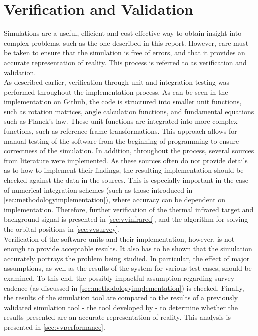 \chapter{Verification and Validation}
\label{ch:vandv}
Simulations are a useful, efficient and cost-effective way to obtain insight into complex problems, such as the one described in this report. However, care must be taken to ensure that the simulation is free of errors, and that it provides an accurate representation of reality. This process is referred to as verification and validation. \\

As described earlier, verification through unit and integration testing was performed throughout the implementation process. As can be seen in the implementation \href{https://github.com/ArjanVermeulen97/thesis-code.git}{on Github}, the code is structured into smaller unit functions, such as rotation matrices, angle calculation functions, and fundamental equations such as Planck's law. These unit functions are integrated into more complex functions, such as reference frame transformations. This approach allows for manual testing of the software from the beginning of programming to ensure correctness of the simulation. In addition, throughout the process, several sources from literature were implemented. As these sources often do not provide details as to how to implement their findings, the resulting implementation should be checked against the data in the sources. This is especially important in the case of numerical integration schemes (such as those introduced in \autoref{sec:methodologyimplementation}), where accuracy can be dependent on implementation. Therefore, further verification of the thermal infrared target and background signal is presented in \autoref{sec:vvinfrared}, and the algorithm for solving the orbital positions in \autoref{sec:vvsurvey}.\\

Verification of the software units and their implementation, however, is not enough to provide acceptable results. It also has to be shown that the simulation accurately portrays the problem being studied. In particular, the effect of major assumptions, as well as the results of the system for various test cases, should be examined. To this end, the possibly impactful assumption regarding survey cadence (as discussed in \autoref{sec:methodologyimplementation}) is checked. Finally, the results of the simulation tool are compared to the results of a previously validated simulation tool - the tool developed by \cite{2017NEOSDT} - to determine whether the results presented are an accurate representation of reality. This analysis is presented in \autoref{sec:vvperformance}.

